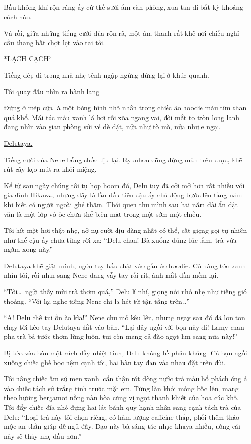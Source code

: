 \documentclass[../main.tex]{subfiles}
\begin{document}
Bầu không khí rộn ràng ấy cứ thế sưởi ấm căn phòng, xua tan đi bất kỳ khoảng cách nào.

Và rồi, giữa những tiếng cười đùa rộn rã, một âm thanh rất khẽ nơi chiếu nghỉ cầu thang bất chợt lọt vào tai tôi.

*LẠCH CẠCH*

Tiếng dép đi trong nhà nhẹ tênh ngập ngừng dừng lại ở khúc quanh.

Tôi quay đầu nhìn ra hành lang.

Đứng ở mép cửa là một bóng hình nhỏ nhắn trong chiếc áo hoodie màu tím than quá khổ. Mái tóc màu xanh lá hơi rối xõa ngang vai, đôi mắt to tròn long lanh đang nhìn vào gian phòng với vẻ dè dặt, nửa như tò mò, nửa như e ngại.

\uline{Delutaya.}

Tiếng cười của Nene bỗng chốc dịu lại. Ryuuhou cũng dừng màn trêu chọc, khẽ rút cây kẹo mút ra khỏi miệng.

Kể từ sau ngày chúng tôi tụ họp hoom đó, Delu tuy đã cởi mở hơn rất nhiều với gia đình Hikawa, nhưng đây là lần đầu tiên cậu ấy chủ động bước lên tầng năm khi biết có người ngoài ghé thăm. Thói quen thu mình sau hai năm dài ẩn dật vẫn là một lớp vỏ ốc chưa thể biến mất trong một sớm một chiều.

Tôi hít một hơi thật nhẹ, nở nụ cười dịu dàng nhất có thể, cất giọng gọi tự nhiên như thể cậu ấy chưa từng rời xa: ``Delu-chan! Bà xuống đúng lúc lắm, trà vừa ngấm xong này.''

Delutaya khẽ giật mình, ngón tay bấu chặt vào gấu áo hoodie. Cô nàng tóc xanh nhìn tôi, rồi nhìn sang Nene đang vẫy tay rối rít, ánh mắt dần mềm lại.

``Tôi\dots\ ngửi thấy mùi trà thơm quá,'' Delu lí nhí, giọng nói nhỏ nhẹ như tiếng gió thoảng. ``Với lại nghe tiếng Nene-chi la hét từ tận tầng trên\dots''

``A! Delu chê tui ồn ào kìa!'' Nene chu mỏ kêu lên, nhưng ngay sau đó đã lon ton chạy tới kéo tay Delutaya dắt vào bàn. ``Lại đây ngồi với bọn này đi! Lamy-chan pha trà bá tước thơm lừng luôn, tui còn mang cả đào ngọt lịm sang nữa này!''

Bị kéo vào bàn một cách đầy nhiệt tình, Delu không hề phản kháng. Cô bạn ngồi xuống chiếc ghế bọc nệm cạnh tôi, hai bàn tay đan vào nhau đặt trên đùi.

Tôi nâng chiếc ấm sứ men xanh, cẩn thận rót dòng nước trà màu hổ phách óng ả vào chiếc tách sứ trắng tinh trước mặt em. Từng làn khói mỏng bốc lên, mang theo hương bergamot nồng nàn hòa cùng vị ngọt thanh khiết của hoa cúc khô. Tôi đẩy chiếc đĩa nhỏ đựng hai lát bánh quy hạnh nhân sang cạnh tách trà của Delu: ``Loại trà này tôi chọn riêng, có hàm lượng caffeine thấp, phối thêm thảo mộc an thần giúp dễ ngủ đấy. Dạo này bà sáng tác nhạc khuya nhiều, uống cái này sẽ thấy nhẹ đầu hơn.''
\end{document}
